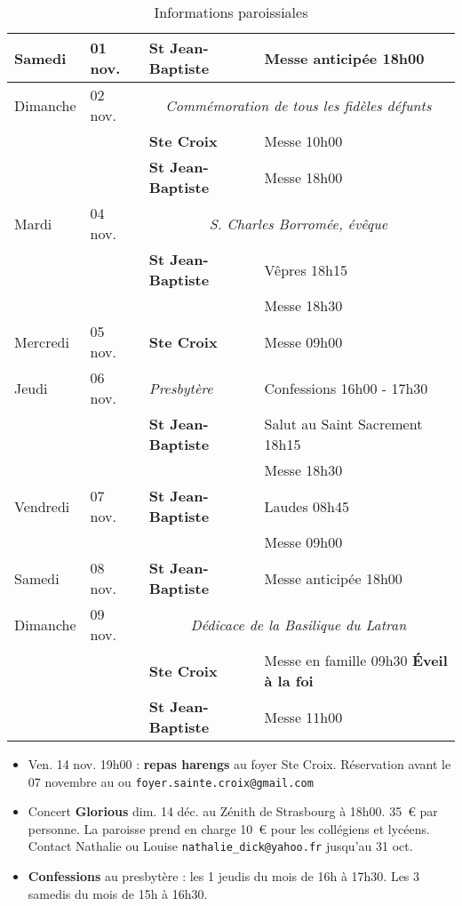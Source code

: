 \documentclass[french,11pt]{article}
\newcommand{\sjb}{\textbf{St Jean-Baptiste}}
\newcommand{\sx}{\textbf{Ste Croix}}
\newcommand{\NewsItem}[1]{%
\vspace{3pt}
\underline{\textbf{#1}}
		  }
\begin{document}

\begin{table}[!h]
\centering
\caption{Informations paroissiales}
\begin{tabularx}{\columnwidth}{|p{}p{}|p{}X|}
\hline
Samedi & 01 nov. & \sjb & Messe anticipée 18h00 \\ \hline
Dimanche &  02 nov.  & 
\multicolumn{2}{c|}{
\emph{Commémoration de tous les fidèles défunts}
} \\
& &	\sx & Messe 10h00 \\
& &	\sjb & Messe 18h00 \\
	 \hline
	 \hline
Mardi &  04 nov.  & 
\multicolumn{2}{c|}{
\emph{S. Charles Borromée, évêque}
} \\
& & \sjb & Vêpres 18h15 \\
& &      & Messe 18h30 \\
\hline
Mercredi &  05 nov.  & 		\sx & Messe 09h00 \\
\hline
Jeudi &  06 nov.   &	\emph{Presbytère} &	Confessions  16h00 - 17h30 \\
 &  &		\sjb &Salut au Saint Sacrement 18h15 \\
& &		&Messe 18h30 \\
\hline
Vendredi &  07 nov.  & 	\sjb & Laudes 08h45 \\
& &		& Messe 09h00 \\
\hline
Samedi &  08 nov.  & 	\sjb & Messe anticipée 18h00 \\
\hline
Dimanche &  09 nov.  & 
\multicolumn{2}{c|}{
\emph{Dédicace de la Basilique du Latran}
} \\
& &		\sx & Messe en famille 09h30 \textbf{Éveil à la foi} \\
& &		\sjb & Messe 11h00 \\
\hline
\end{tabularx}
\end{table}

\begin{framed}
\begin{itemize}
\item Ven. 14 nov. 19h00 : \textbf{repas harengs} au foyer Ste Croix. Réservation avant le 07 novembre au  ou \texttt{foyer.sainte.croix@gmail.com}
\item
Concert \textbf{Glorious} dim. 14 déc. au Zénith de Strasbourg à 18h00. 35~€ par personne. La paroisse prend en charge 10~€ pour les collégiens et lycéens. Contact Nathalie ou Louise \texttt{nathalie\_dick@yahoo.fr} jusqu'au 31 oct.
\item
\textbf{Confessions} au presbytère : les 1\iers{} jeudis du mois de 16h à 17h30. Les 3\iemes{} samedis du mois de 15h à 16h30.
\end{itemize}
\end{framed}
\end{document}
